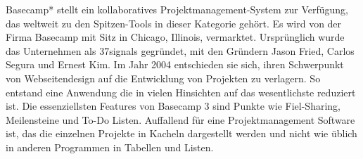 Basecamp* stellt ein kollaboratives Projektmanagement-System zur Verfügung, das weltweit zu den Spitzen-Tools in dieser Kategorie gehört. Es wird von der Firma Basecamp mit Sitz in Chicago, Illinois, vermarktet. Ursprünglich wurde das Unternehmen als 37signals gegründet, mit den Gründern Jason Fried, Carlos Segura und Ernest Kim. Im Jahr 2004 entschieden sie sich, ihren Schwerpunkt von Webseitendesign auf die Entwicklung von Projekten zu verlagern.
So entstand eine Anwendung die in vielen Hinsichten auf das wesentlichste reduziert ist. Die essenziellsten Features von Basecamp 3 sind Punkte wie Fiel-Sharing, Meilensteine und To-Do Listen. Auffallend für eine Projektmanagement Software ist, das die einzelnen Projekte in Kacheln dargestellt werden und nicht wie üblich in anderen Programmen in Tabellen und Listen.





